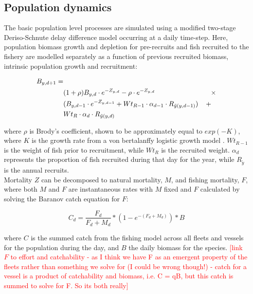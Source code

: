 \documentclass[review]{elsarticle}
\begin{document}
\subsection{Population dynamics}

The basic population level processes are simulated using a modified two-stage
Deriso-Schnute delay difference model \cite{Deriso1980, Schnute1985,
	Dichmont2003} occurring at a daily time-step. Here, population biomass
growth and depletion for pre-recruits and fish recruited to the fishery are
modelled separately as a function of previous recruited biomass, intrinsic
population growth and recruitment:

\begin{equation*}
	\begin{split}
	B_{y,d+1} = &\\
	& (1 + \rho) B_{y,d} \cdot e^{-Z_{y,d}} - \rho \cdot e^{-Z_{y,d}} \hspace{2.9cm}
	\times \\  
	& (B_{y,d-1} \cdot e^{-Z_{y,d-1}} + Wt_{R-1} \cdot \alpha_{d-1} \cdot R_{\tilde{y}(y,d-1)})
	\hspace{0.4cm} + \\
	& Wt_{R} \cdot \alpha_{d} \cdot R_{\tilde{y}(y,d)} 
	\end{split}
\end{equation*}

where $\rho$ is Brody's coefficient, shown to be approximately equal to
$exp(-K)$, where $K$ is the growth rate from a von bertalanffy logistic growth
model \cite{Schnute1985}. $Wt_{R-1}$ is the weight of fish prior to
recruitment, while $Wt_{R}$ is the recruited weight. $\alpha_{d}$ represents
the proportion of fish recruited during that day for the year, while
$R_{\tilde{y}}$ is the annual recruits. \\

Mortality $Z$ can be decomposed to natural mortality, $M$, and fishing
mortality, $F$, where both $M$ and $F$ are instantaneous rates with $M$ fixed
and $F$ calculated by solving the Baranov catch equation \cite{Hilborn1992b}
for $F$:

\begin{equation*}
C_{d} = \frac{F_{d}}{F_{d}+M_{d}} * (1 - e^{-(F_{d} + M_{d})}) * B
\end{equation*}

where $C$ is the summed catch from the fishing model across all fleets and
vessels for the population during the day, and $B$ the daily biomass for the
species. \textcolor{red}{[link $F$ to effort and catchability - as I think we
	have F as an emergent property of the fleets rather than something we
	solve for (I could be wrong though!) - catch for a vessel is a product of
	catchability and biomass, i.e. C = qB, but this catch is summed to
	solve for F. So its both really]}\\
\end{document}
